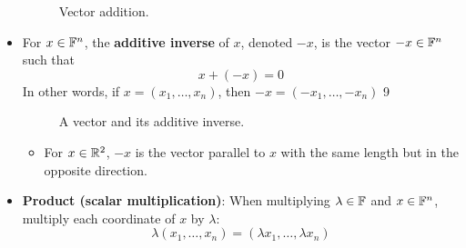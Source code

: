 \documentclass[../main.tex]{subfiles}
\begin{document}
\begin{itemize}
\begin{figure}[h!]
        \caption{Vector addition.}
        \label{fig:addvectors}
    \end{figure}
    \item \dq
        {For $x\in\mathbb{F}^n$, the \textbf{additive inverse} of $x$, denoted $-x$, is the vector $-x\in\mathbb{F}^n$ such that
        \begin{equation*}
            x+(-x)=0
        \end{equation*}
        In other words, if $x=\left( x_1,\dots,x_n \right)$, then $-x=\left( -x_1,\dots,-x_n \right)$}
    {9}
    \begin{figure}[h!]
        \centering
        \caption{A vector and its additive inverse.}
        \label{fig:invvectors}
    \end{figure}
    \begin{itemize}
        \item For $x\in\mathbb{R}^2$, $-x$ is the vector parallel to $x$ with the same length but in the opposite direction.
    \end{itemize}
    \item \textbf{Product (scalar multiplication)}: When multiplying $\lambda\in\mathbb{F}$ and $x\in\mathbb{F}^n$, multiply each coordinate of $x$ by $\lambda$:
    \begin{equation*}
        \lambda\left( x_1,\dots,x_n \right)=\left( \lambda x_1,\dots,\lambda x_n \right)
    \end{equation*}
    \begin{figure}[h!]
        \centering
\end{figure}
\end{itemize}
\end{document}
